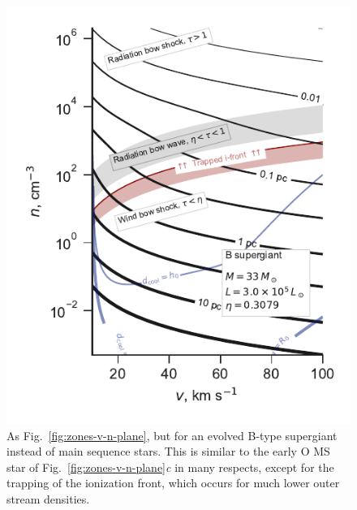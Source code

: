 \begin{figure}
  \includegraphics[width=\linewidth]{figs/zones-v-n-plane-BSG}
  \caption{As Fig.~\ref{fig:zones-v-n-plane}, but for an evolved
    B-type supergiant instead of main sequence stars.  This is similar
    to the early O MS star of Fig.~\ref{fig:zones-v-n-plane}\textit{c}
    in many respects, except for the trapping of the ionization front,
    which occurs for much lower outer stream densities.}
  \label{fig:B-supergiant}
\end{figure}


